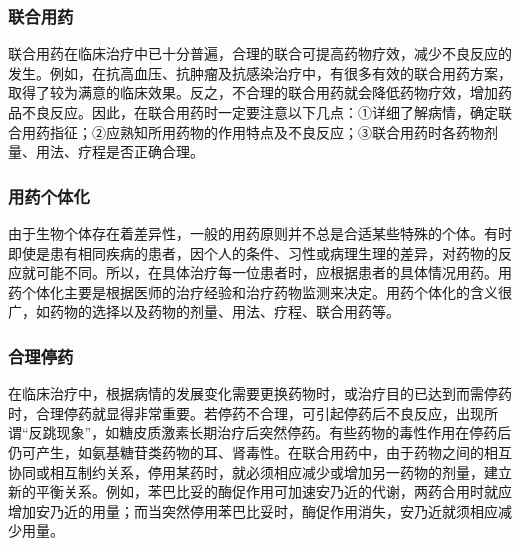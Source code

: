\subsubsection{联合用药}

联合用药在临床治疗中已十分普遍，合理的联合可提高药物疗效，减少不良反应的发生。例如，在抗高血压、抗肿瘤及抗感染治疗中，有很多有效的联合用药方案，取得了较为满意的临床效果。反之，不合理的联合用药就会降低药物疗效，增加药品不良反应。因此，在联合用药时一定要注意以下几点：①详细了解病情，确定联合用药指征；②应熟知所用药物的作用特点及不良反应；③联合用药时各药物剂量、用法、疗程是否正确合理。

\subsubsection{用药个体化}

由于生物个体存在着差异性，一般的用药原则并不总是合适某些特殊的个体。有时即使是患有相同疾病的患者，因个人的条件、习性或病理生理的差异，对药物的反应就可能不同。所以，在具体治疗每一位患者时，应根据患者的具体情况用药。用药个体化主要是根据医师的治疗经验和治疗药物监测来决定。用药个体化的含义很广，如药物的选择以及药物的剂量、用法、疗程、联合用药等。

\subsubsection{合理停药}

在临床治疗中，根据病情的发展变化需要更换药物时，或治疗目的已达到而需停药时，合理停药就显得非常重要。若停药不合理，可引起停药后不良反应，出现所谓“反跳现象”，如糖皮质激素长期治疗后突然停药。有些药物的毒性作用在停药后仍可产生，如氨基糖苷类药物的耳、肾毒性。在联合用药中，由于药物之间的相互协同或相互制约关系，停用某药时，就必须相应减少或增加另一药物的剂量，建立新的平衡关系。例如，苯巴比妥的酶促作用可加速安乃近的代谢，两药合用时就应增加安乃近的用量；而当突然停用苯巴比妥时，酶促作用消失，安乃近就须相应减少用量。